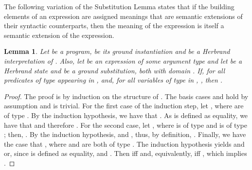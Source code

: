 \documentclass[submission,copyright]{eptcs}
\newtheorem{lemma}{Lemma}
\theoremstyle{definition}
\begin{document}
{The following variation of the Substitution Lemma states that if the building elements of an expression are assigned meanings that are semantic extensions of their syntactic counterparts, then the meaning of the expression is itself a semantic extension of the expression.}
\begin{lemma} \label{lm_state_substitution_extension}
Let  be a program,  be its ground instantiation and  be a Herbrand
interpretation of . Also, let  be an expression
of some argument type  and
let  be a Herbrand state and  be a ground substitution, both with domain .
If, for all predicates  of type  appearing in , 
and, for all variables  of type  in , , then
.
\end{lemma}
\begin{proof}
The proof is by induction on the structure of .
The basis cases  and 
hold by assumption and  is trivial.
For the first case of the induction step, let ,
where  are of type
. By the induction hypothesis, we have that
.
As  is defined as equality, we have that  and therefore .
For the second case, let ,
where  is of type  and  is of type ; then, .
By the induction hypothesis, 
and ,
thus, by definition, .
Finally, we have the case that , where  and  are both of type . The induction hypothesis yields  and  or, since  is defined as equality,  and . Then   iff   and, equivalently,  iff , which implies .
\end{proof}
\end{document}
